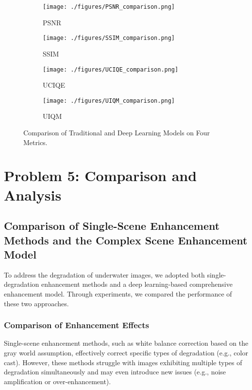 \documentclass{apmcmthesis}
\begin{document}
\begin{figure}[H]
    \centering
    \begin{subfigure}[b]{0.22\textwidth} %
        \centering
        \texttt{[image: ./figures/PSNR\_comparison.png]}
        \caption{PSNR}
        \label{fig:traditional_1}
    \end{subfigure}
    \hfill
    \begin{subfigure}[b]{0.22\textwidth}
        \centering
        \texttt{[image: ./figures/SSIM\_comparison.png]}
        \caption{SSIM}
        \label{fig:traditional_2}
    \end{subfigure}
    \hfill
    \begin{subfigure}[b]{0.22\textwidth}
        \centering
        \texttt{[image: ./figures/UCIQE\_comparison.png]}
        \caption{UCIQE}
        \label{fig:deep_1}
    \end{subfigure}
    \hfill
    \begin{subfigure}[b]{0.22\textwidth}
        \centering
        \texttt{[image: ./figures/UIQM\_comparison.png]}
        \caption{UIQM}
        \label{fig:deep_2}
    \end{subfigure}
    \caption{ Comparison of Traditional and Deep Learning Models on Four Metrics.}
    \label{fig:comparison}
\end{figure}

\section{Problem 5: Comparison and Analysis}
\subsection{Comparison of Single-Scene Enhancement Methods and the Complex Scene Enhancement Model}
To address the degradation of underwater images, we adopted both single-degradation enhancement methods and a deep learning-based comprehensive enhancement model. Through experiments, we compared the performance of these two approaches.

\subsubsection{Comparison of Enhancement Effects}
Single-scene enhancement methods, such as white balance correction based on the gray world assumption, effectively correct specific types of degradation (e.g., color cast). However, these methods struggle with images exhibiting multiple types of degradation simultaneously and may even introduce new issues (e.g., noise amplification or over-enhancement).
\end{document}
